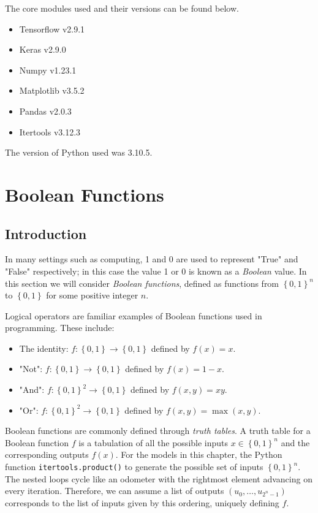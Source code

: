 \documentclass{somasmsc}
\begin{document}
The core modules used and their versions can be found below.

\begin{itemize}
    \item Tensorflow v2.9.1 \citep{tensorflow2015-whitepaper}
    \item Keras v2.9.0 \citep{chollet2015keras}
    \item Numpy v1.23.1 \citep{harris2020array}
    \item Matplotlib v3.5.2 \citep{Hunter:2007}
    \item Pandas v2.0.3 \citep{mckinney-proc-scipy-2010}
    \item Itertools v3.12.3 \citep{van1995python}
\end{itemize}

The version of Python used was 3.10.5.

\chapter{Boolean Functions}\label{bool}

\section{Introduction}

In many settings such as computing, 1 and 0 are used to represent "True" and "False" respectively; in this case the value 1 or 0 is known as a \textit{Boolean} value. In this section we will consider \textit{Boolean functions}, defined as functions from $\left\{0, 1\right\}^n$ to $\left\{0, 1\right\}$ for some positive integer $n$.

Logical operators are familiar examples of Boolean functions used in programming. These include:
\begin{itemize}
    \item The identity: $f:\left\{0, 1\right\} \rightarrow \left\{0, 1\right\}$ defined by $f(x) = x$.
    \item "Not": $f:\left\{0, 1\right\} \rightarrow \left\{0, 1\right\}$ defined by $f(x) = 1-x$.
    \item "And": $f:\left\{0, 1\right\}^2 \rightarrow \left\{0, 1\right\}$ defined by $f(x,y) = xy$.
    \item "Or": $f:\left\{0, 1\right\}^2 \rightarrow \left\{0, 1\right\}$ defined by $f(x,y) = \max{\left(x, y\right)}$.
\end{itemize}

Boolean functions are commonly defined through \textit{truth tables}. A truth table for a Boolean function $f$ is a tabulation of all the possible inputs $x \in \left\{0, 1\right\}^n$ and the corresponding outputs $f(x)$. For the models in this chapter, the Python function \verb|itertools.product()| to generate the possible set of inputs $\left\{0, 1\right\}^n$. The nested loops cycle like an odometer with the rightmost element advancing on every iteration. Therefore, we can assume a list of outputs $\left(u_0, \dots, u_{2^n-1}\right)$ corresponds to the list of inputs given by this ordering, uniquely defining $f$.
\end{document}
